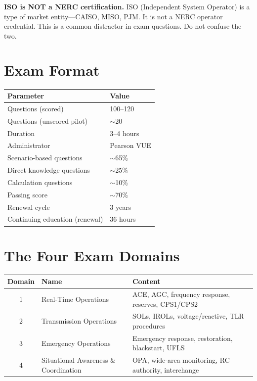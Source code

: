 \documentclass[12pt,twoside,openright]{memoir}
\begin{document}
\begin{warningbox}
\textbf{ISO is NOT a NERC certification.} ISO (Independent System Operator) is a type
of market entity—CAISO, MISO, PJM. It is not a NERC operator credential. This is a
common distractor in exam questions. Do not confuse the two.
\end{warningbox}

\section{Exam Format}

\begin{center}
\begin{tabular}{@{}ll@{}}
\toprule
\rowcolor{nercblue!15}
\textbf{Parameter} & \textbf{Value} \\
\midrule
Questions (scored) & 100--120 \\
\rowcolor{rowlight}
Questions (unscored pilot) & $\sim$20 \\
Duration & 3--4 hours \\
\rowcolor{rowlight}
Administrator & Pearson VUE \\
Scenario-based questions & $\sim$65\% \\
\rowcolor{rowlight}
Direct knowledge questions & $\sim$25\% \\
Calculation questions & $\sim$10\% \\
\rowcolor{rowlight}
Passing score & $\sim$70\% \\
Renewal cycle & 3 years \\
\rowcolor{rowlight}
Continuing education (renewal) & 36 hours \\
\bottomrule
\end{tabular}
\end{center}

\section{The Four Exam Domains}

\begin{center}
\begin{tabular}{@{}clp{7cm}@{}}
\toprule
\rowcolor{nercblue!15}
\textbf{Domain} & \textbf{Name} & \textbf{Content} \\
\midrule
1 & Real-Time Operations & ACE, AGC, frequency response, reserves, CPS1/CPS2 \\
\rowcolor{rowlight}
2 & Transmission Operations & SOLs, IROLs, voltage/reactive, TLR procedures \\
3 & Emergency Operations & Emergency response, restoration, blackstart, UFLS \\
\rowcolor{rowlight}
4 & Situational Awareness \& Coordination & OPA, wide-area monitoring, RC authority, interchange \\
\bottomrule
\end{tabular}
\end{center}
\end{document}
